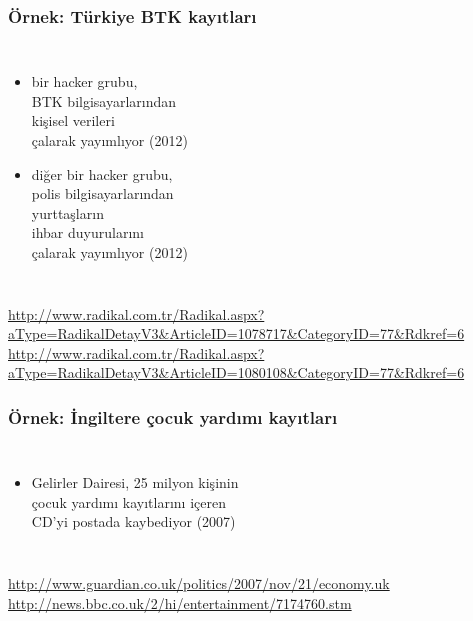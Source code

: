 \documentclass[dvipsnames]{beamer}
\theoremstyle{definition}
\theoremstyle{example}
\theoremstyle{plain}
\begin{document}
\begin{frame}
  \frametitle{Örnek: Türkiye BTK kayıtları}

  \begin{columns}

    \begin{itemize}
      \item bir hacker grubu,\\
        BTK bilgisayarlarından\\
        kişisel verileri\\
        çalarak yayımlıyor (2012)
      \item diğer bir hacker grubu,\\
        polis bilgisayarlarından\\
        yurttaşların\\
        ihbar duyurularını\\
        çalarak yayımlıyor (2012)
    \end{itemize}
  \end{columns}

  \medskip
  \tiny{\url{http://www.radikal.com.tr/Radikal.aspx?aType=RadikalDetayV3&ArticleID=1078717&CategoryID=77&Rdkref=6}}\\
  \tiny{\url{http://www.radikal.com.tr/Radikal.aspx?aType=RadikalDetayV3&ArticleID=1080108&CategoryID=77&Rdkref=6}}\\
\end{frame}

\begin{frame}
  \frametitle{Örnek: İngiltere çocuk yardımı kayıtları}

  \begin{columns}

    \begin{itemize}
      \item Gelirler Dairesi, 25 milyon kişinin\\
        çocuk yardımı kayıtlarını içeren\\
        CD'yi postada kaybediyor (2007)
    \end{itemize}
  \end{columns}

  \medskip
  \tiny{\url{http://www.guardian.co.uk/politics/2007/nov/21/economy.uk}}\\
  \tiny{\url{http://news.bbc.co.uk/2/hi/entertainment/7174760.stm}}\\
\end{frame}
\end{document}
